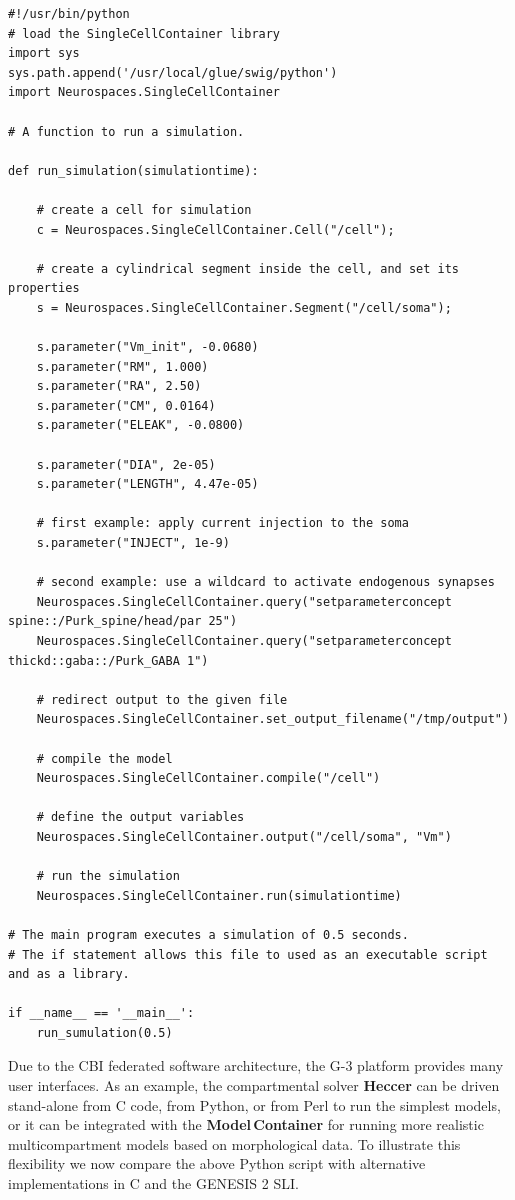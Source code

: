 \documentclass[12pt]{article}
\begin{document}
{\vspace*{1mm}
 { \footnotesize
  \linenumbers
  {\begin{verbatim}
#!/usr/bin/python
# load the SingleCellContainer library
import sys
sys.path.append('/usr/local/glue/swig/python')
import Neurospaces.SingleCellContainer

# A function to run a simulation.

def run_simulation(simulationtime):
   
    # create a cell for simulation
    c = Neurospaces.SingleCellContainer.Cell("/cell");

    # create a cylindrical segment inside the cell, and set its properties
    s = Neurospaces.SingleCellContainer.Segment("/cell/soma");

    s.parameter("Vm_init", -0.0680)
    s.parameter("RM", 1.000)
    s.parameter("RA", 2.50)
    s.parameter("CM", 0.0164)
    s.parameter("ELEAK", -0.0800)

    s.parameter("DIA", 2e-05)
    s.parameter("LENGTH", 4.47e-05)

    # first example: apply current injection to the soma
    s.parameter("INJECT", 1e-9)

    # second example: use a wildcard to activate endogenous synapses
    Neurospaces.SingleCellContainer.query("setparameterconcept spine::/Purk_spine/head/par 25")
    Neurospaces.SingleCellContainer.query("setparameterconcept thickd::gaba::/Purk_GABA 1")
    
    # redirect output to the given file
    Neurospaces.SingleCellContainer.set_output_filename("/tmp/output")
    
    # compile the model
    Neurospaces.SingleCellContainer.compile("/cell")
    
    # define the output variables
    Neurospaces.SingleCellContainer.output("/cell/soma", "Vm")
    
    # run the simulation
    Neurospaces.SingleCellContainer.run(simulationtime)

# The main program executes a simulation of 0.5 seconds.
# The if statement allows this file to used as an executable script and as a library.

if __name__ == '__main__':
    run_sumulation(0.5) 
\end{verbatim}
  \vspace*{1mm} }}}

Due to the CBI federated software architecture, the G-3 platform provides many user
interfaces.  As an example, the compartmental solver {\bf Heccer} can be driven
stand-alone from C code, from Python, or from Perl to run the simplest
models, or it can be integrated with the {\bf Model\,Container} for
running more realistic multicompartment models based on morphological
data.  To illustrate this flexibility we now compare the above Python
script with alternative implementations in C and the GENESIS 2 SLI.
\end{document}

